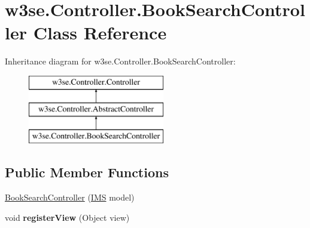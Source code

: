 \hypertarget{classw3se_1_1_controller_1_1_book_search_controller}{\section{w3se.\-Controller.\-Book\-Search\-Controller Class Reference}
\label{classw3se_1_1_controller_1_1_book_search_controller}
}
Inheritance diagram for w3se.\-Controller.\-Book\-Search\-Controller\-:\begin{figure}[H]
\begin{center}
\leavevmode
\includegraphics[height=3.000000cm]{classw3se_1_1_controller_1_1_book_search_controller}
\end{center}
\end{figure}
\subsection*{Public Member Functions}
\begin{DoxyCompactItemize}
\item 
\hyperlink{classw3se_1_1_controller_1_1_book_search_controller_ae97f9c5caeb001fa55e695feffc80a28}{Book\-Search\-Controller} (\hyperlink{classw3se_1_1_model_1_1_i_m_s}{I\-M\-S} model)
\item 
\hypertarget{classw3se_1_1_controller_1_1_book_search_controller_abaf5f8fcf74f1980f2a03f4c161129ef}{void {\bfseries register\-View} (Object view)}\label{classw3se_1_1_controller_1_1_book_search_controller_abaf5f8fcf74f1980f2a03f4c161129ef}

\end{DoxyCompactItemize}
